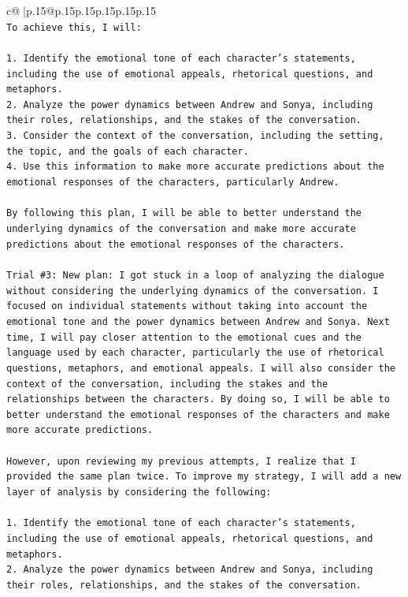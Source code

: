 \documentclass{article}
\begin{document}
{\begin{supertabular}{c@{$\;$}|p{.15\linewidth}@{}p{.15\linewidth}p{.15\linewidth}p{.15\linewidth}p{.15\linewidth}p{.15\linewidth}}
{{{\\ 
\texttt{To achieve this, I will:} \\
\\ 
\texttt{1. Identify the emotional tone of each character's statements, including the use of emotional appeals, rhetorical questions, and metaphors.} \\
\texttt{2. Analyze the power dynamics between Andrew and Sonya, including their roles, relationships, and the stakes of the conversation.} \\
\texttt{3. Consider the context of the conversation, including the setting, the topic, and the goals of each character.} \\
\texttt{4. Use this information to make more accurate predictions about the emotional responses of the characters, particularly Andrew.} \\
\\ 
\texttt{By following this plan, I will be able to better understand the underlying dynamics of the conversation and make more accurate predictions about the emotional responses of the characters.} \\
\\ 
\texttt{Trial \#3: New plan: I got stuck in a loop of analyzing the dialogue without considering the underlying dynamics of the conversation. I focused on individual statements without taking into account the emotional tone and the power dynamics between Andrew and Sonya. Next time, I will pay closer attention to the emotional cues and the language used by each character, particularly the use of rhetorical questions, metaphors, and emotional appeals. I will also consider the context of the conversation, including the stakes and the relationships between the characters. By doing so, I will be able to better understand the emotional responses of the characters and make more accurate predictions.} \\
\\ 
\texttt{However, upon reviewing my previous attempts, I realize that I provided the same plan twice. To improve my strategy, I will add a new layer of analysis by considering the following:} \\
\\ 
\texttt{1. Identify the emotional tone of each character's statements, including the use of emotional appeals, rhetorical questions, and metaphors.} \\
\texttt{2. Analyze the power dynamics between Andrew and Sonya, including their roles, relationships, and the stakes of the conversation.} \\
}}}
\end{supertabular}}
\end{document}
